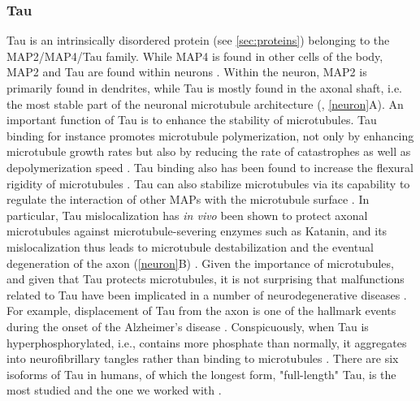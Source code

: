 \subsubsection{Tau}
\label{sec:Tau_intro}
Tau is an intrinsically disordered protein (see \autoref{sec:proteins}) belonging to the MAP2/MAP4/Tau family. While MAP4 is found in other cells of the body, MAP2 and Tau are found within neurons . Within the neuron, MAP2 is primarily found in dendrites, while Tau is mostly found in the axonal shaft, i.e. the most stable part of the neuronal microtubule architecture (\cite{Dehmelt2005}, \autoref{neuron}A). An important function of Tau is to enhance the stability of microtubules. Tau binding for instance promotes microtubule polymerization, not only by enhancing microtubule growth rates but also by reducing the rate of catastrophes as well as depolymerization speed \parencite{Drechsel1992}. Tau binding also has been found to increase the flexural rigidity of microtubules . Tau can also stabilize microtubules via its capability to regulate the interaction of other MAPs with the microtubule surface \parencite{Morris2011b}. In particular, Tau mislocalization has \textit{in vivo} been shown to protect axonal microtubules against microtubule-severing enzymes such as Katanin, and its mislocalization thus leads to microtubule destabilization and the eventual degeneration of the axon (\autoref{neuron}B) \parencite{Qiang2006}. Given the importance of microtubules, and given that Tau protects microtubules, it is not surprising that malfunctions related to Tau have been implicated in a number of neurodegenerative diseases \parencite{Gao2018,Morris2011b,iqbal2016tau}. For example, displacement of Tau from the axon is one of the hallmark events during the onset of the Alzheimer’s disease \parencite{zempel2015tau}. Conspicuously, when Tau is hyperphosphorylated, i.e., contains more phosphate than normally, it aggregates into neurofibrillary tangles rather than binding to microtubules . There are six isoforms of Tau in humans, of which the longest form, "full-length" Tau, is the most studied and the one we worked with .\par


